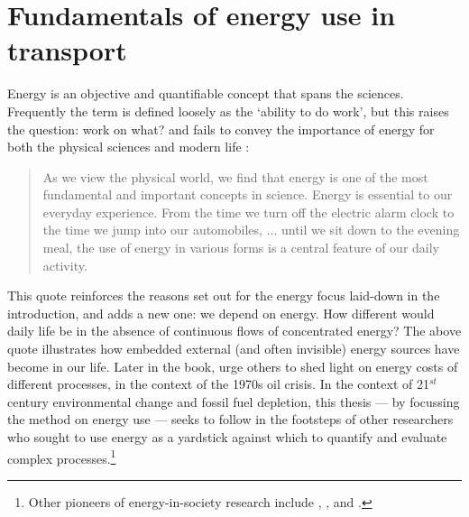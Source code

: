 \documentclass[a4paper, 11pt, twoside]{Thesis}
\begin{document}
\section{Fundamentals of energy use in transport} \label{sfundamentals}
Energy is an objective and quantifiable concept that spans the sciences.
Frequently the term is defined loosely as the `ability to do work', but this
raises the question: work on what? and fails to convey the importance of energy
for both the physical sciences and modern life \citep[p.~99]{Rouse1975}:
\begin{quotation}
 As we view the physical world, we find that energy is one of the most
fundamental and important concepts in science. Energy is essential to our
everyday experience. From the time we turn off the electric alarm clock to the
time we jump into our automobiles, ... until we sit down to the evening meal,
the use of energy in various forms is a central feature of our daily activity.
\end{quotation}
This quote reinforces the reasons set out for the energy focus laid-down in the
introduction, and adds a new one: we depend on energy. How different would
daily life be in the absence of continuous flows of concentrated energy?
The above quote illustrates how embedded external (and often invisible)
energy sources have become in our life. Later in the book, \citet{Rouse1975} urge
others to shed light on energy costs of different processes, in the context of
the 1970s oil crisis. In the context of 21$^{st}$ century environmental change
and fossil fuel depletion, this thesis --- by focussing the method on
energy use --- seeks to follow in the footsteps
of other researchers who sought to use energy as a yardstick against which to quantify
and evaluate complex processes.\footnote{Other pioneers of energy-in-society
research include \citet{Soddy1933, Soddy1935}, \citet{Odum1971, Odum2001},
\citet{Steadman1977} and \citet{Smil1993, Smil2005, Smil2008}.
}
\end{document}
